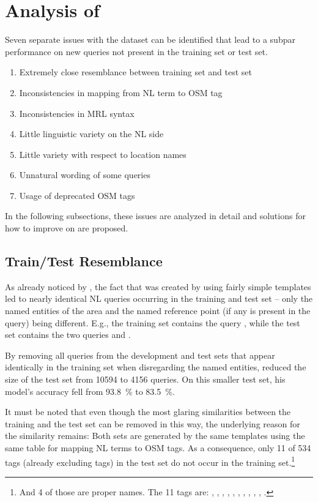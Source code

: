 \section{Analysis of \nlmapstwo{}}

Seven separate issues with the \nlmapstwo{} dataset can be identified that lead
to a subpar performance on new queries not present in the training set or test
set.

\begin{enumerate}
\item Extremely close resemblance between training set and test set
\item Inconsistencies in mapping from NL term to OSM tag
\item Inconsistencies in MRL syntax
\item Little linguistic variety on the NL side
\item Little variety with respect to location names
\item Unnatural wording of some queries
\item Usage of deprecated OSM tags
\end{enumerate}
In the following subsections, these issues are analyzed in detail and solutions
for how to improve on \nlmapstwo{} are proposed.

\subsection{Train/Test Resemblance}
\label{sec:train-test-resemblance}

As already noticed by \textcite{staniek-2020}, the fact that \nlmapstwo{} was
created by using fairly simple templates led to nearly identical NL queries
occurring in the training and test set – only the named entities of the area and
the named reference point (if any is present in the query) being different.
E.g., the training set contains the query ,
while the test set contains the two queries 
and .

By removing all queries from the development and test sets that appear
identically in the training set when disregarding the named entities,
\textcite{staniek-2020} reduced the size of the test set from \num{10594}
to \num{4156} queries. On this smaller test set, his model’s accuracy fell from
\SI{93.8}{\%} to \SI{83.5}{\%}.

It must be noted that even though the most glaring similarities between the
training and the test set can be removed in this way, the underlying reason for
the similarity remains: Both sets are generated by the same templates using the
same table for mapping NL terms to OSM tags. As a consequence, only \num{11} of
\num{534} tags (already excluding  tags) in the test set do not
occur in the training set.\footnote{And \num{4} of those are proper names. The
  \num{11} tags are: ,
  , , ,
  , , ,
  , ,
  , .}

